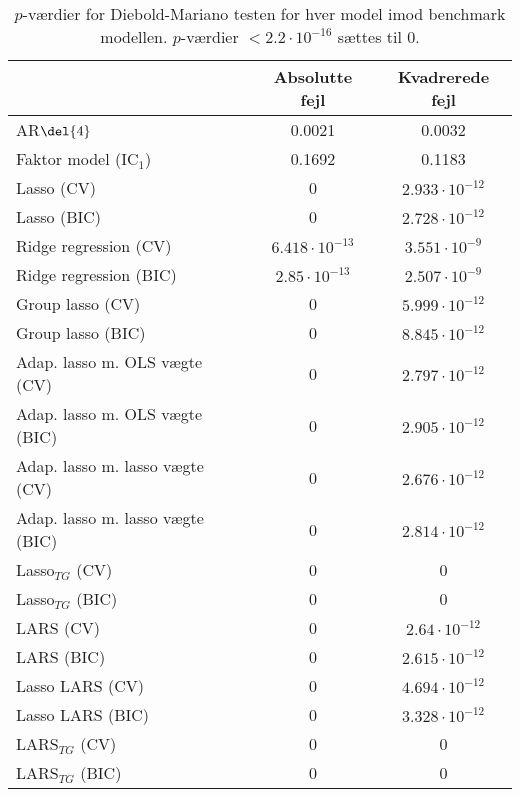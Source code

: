 \begin{table}[ht]
\center
\begin{tabular}{lcc}
\toprule
 & Absolutte fejl & Kvadrerede fejl \\ \midrule
AR\(\del{4}\) & 0.0021 & 0.0032 \\  
Faktor model (IC\(_1\)) & 0.1692 & 0.1183 \\
Lasso (CV) & 0 & $2.933\cdot 10^{-12}$ \\
Lasso (BIC) & 0 & $2.728\cdot 10^{-12}$ \\
Ridge regression (CV) & $6.418 \cdot 10^{-13}$  & $3.551\cdot 10^{-9}$  \\
Ridge regression (BIC) &$2.85\cdot 10^{-13}$& $2.507\cdot 10^{-9}$\\
Group lasso (CV) & 0 &$ 5.999\cdot 10^{-12}$  \\
Group lasso (BIC) & 0& $8.845\cdot 10^{-12}$ \\
Adap. lasso m. OLS vægte (CV) & 0& $2.797\cdot 10^{-12} $\\
Adap. lasso m. OLS vægte (BIC) & 0& $2.905\cdot 10^{-12}$\\
Adap. lasso m. lasso vægte (CV) & 0 & $2.676\cdot 10^{-12}$\\
Adap. lasso m. lasso vægte (BIC) & 0& $2.814\cdot 10^{-12}$\\
Lasso$_{TG}$ (CV)&  0 & 0 \\
Lasso$_{TG}$ (BIC) & 0 & 0 \\
LARS (CV) & 0 & $2.64\cdot 10^{-12}$  \\
LARS (BIC) & 0& $2.615\cdot 10^{-12}$ \\
Lasso LARS (CV) & 0& $4.694 \cdot 10^{-12}$ \\
Lasso LARS (BIC) & 0& $3.328 \cdot 10^{-12}$ \\ 
LARS$_{TG}$ (CV) & 0 & 0 \\
LARS$_{TG}$ (BIC) &0 & 0\\ \bottomrule
\end{tabular}
\caption{\(p\)-værdier for Diebold-Mariano testen for hver model imod benchmark modellen.
\(p\)-værdier \(< 2.2 \cdot 10^{-16}\) sættes til 0.} \label{tab:dm_test}
\end{table}
